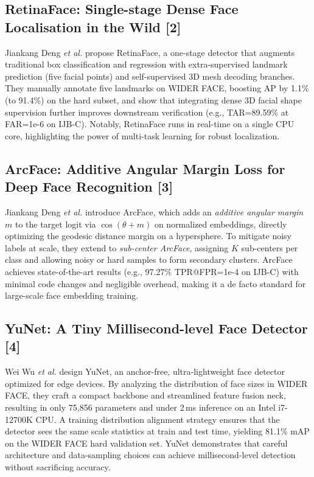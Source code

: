 \documentclass[conference]{IEEEtran}
\begin{document}
\subsection{RetinaFace: Single-stage Dense Face Localisation in the Wild [2]}
Jiankang Deng \emph{et al.} propose RetinaFace, a one-stage detector that augments traditional box classification and regression with extra-supervised landmark prediction (five facial points) and self-supervised 3D mesh decoding branches. They manually annotate five landmarks on WIDER FACE, boosting AP by 1.1\% (to 91.4\%) on the hard subset, and show that integrating dense 3D facial shape supervision further improves downstream verification (e.g., TAR=89.59\% at FAR=1e-6 on IJB-C). Notably, RetinaFace runs in real-time on a single CPU core, highlighting the power of multi-task learning for robust localization.

\subsection{ArcFace: Additive Angular Margin Loss for Deep Face Recognition [3]}
Jiankang Deng \emph{et al.} introduce ArcFace, which adds an \emph{additive angular margin} $m$ to the target logit via $\cos(\theta + m)$ on normalized embeddings, directly optimizing the geodesic distance margin on a hypersphere. To mitigate noisy labels at scale, they extend to \emph{sub-center ArcFace}, assigning $K$ sub-centers per class and allowing noisy or hard samples to form secondary clusters. ArcFace achieves state-of-the-art results (e.g., 97.27\% TPR@FPR=1e-4 on IJB-C) with minimal code changes and negligible overhead, making it a de facto standard for large-scale face embedding training.

\subsection{YuNet: A Tiny Millisecond-level Face Detector [4]}
Wei Wu \emph{et al.} design YuNet, an anchor-free, ultra-lightweight face detector optimized for edge devices. By analyzing the distribution of face sizes in WIDER FACE, they craft a compact backbone and streamlined feature fusion neck, resulting in only 75,856 parameters and under 2 ms inference on an Intel i7-12700K CPU. A training distribution alignment strategy ensures that the detector sees the same scale statistics at train and test time, yielding 81.1\% mAP on the WIDER FACE hard validation set. YuNet demonstrates that careful architecture and data-sampling choices can achieve millisecond-level detection without sacrificing accuracy.
\end{document}
